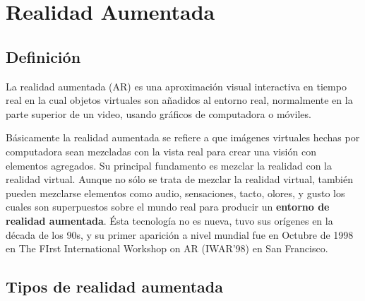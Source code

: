 \newpage
\section{Realidad Aumentada}
\setcounter{secnumdepth}{2}

\subsection{Definición}
La realidad aumentada (AR) es una aproximación visual interactiva en tiempo real en la cual objetos virtuales son añadidos al entorno real, normalmente en la parte superior de un video, usando gráficos de computadora o móviles.\cite{B04} \par
Básicamente la realidad aumentada se refiere a que imágenes virtuales hechas por computadora sean mezcladas con la vista real para crear una visión con elementos agregados. Su principal fundamento es mezclar la realidad con la realidad virtual. Aunque no sólo se trata de mezclar la realidad virtual, también pueden mezclarse elementos como audio, sensaciones, tacto, olores, y gusto los cuales son superpuestos sobre el mundo real para producir un \textbf{entorno de realidad aumentada}.\cite{B05}
Ésta tecnología no es nueva, tuvo sus orígenes en la década de los 90s\cite{B04}, y su primer aparición a nivel mundial fue en Octubre de 1998 en The FIrst International Workshop on AR (IWAR'98) en San Francisco\cite{B05}.\par

\subsection{Tipos de realidad aumentada}

